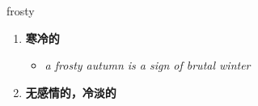 
\begin{frame}
{\huge frosty}
\begin{center}
\begin{enumerate}\Large
  \item \textbf{寒冷的}
  \begin{itemize}
    \item \em{\Large{a frosty autumn is a sign of brutal winter}}
  \end{itemize}
  \item \textbf{无感情的，冷淡的}
\end{enumerate}
\end{center}
\end{frame}
